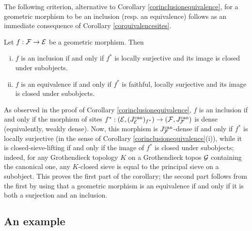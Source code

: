 \documentclass[a4paper,12pt]{article}
\begin{document}
The following criterion, alternative to Corollary \ref{corinclusionequivalence}, for a geometric morphism to be an inclusion (resp. an equivalence) follows as an immediate consequence of Corollary \ref{corquivalencesites}.

\begin{corollary}\label{corinclusionequivalence2}
	Let $f:{\cal F}\to {\cal E}$ be a geometric morphism. Then
	
	\begin{enumerate}[(i)]
		\item $f$ is an inclusion if and only if $f^{\ast}$ is locally surjective and its image is closed under subobjects.

		\item $f$ is an equivalence if and only if $f^{\ast}$ is faithful, locally surjective and its image is closed under subobjects.		
	\end{enumerate}
\end{corollary}

\begin{proofs}
	As observed in the proof of Corollary \ref{corinclusionequivalence}, $f$ is an inclusion if and only if the morphism of sites $f^{\ast}:({\cal E}, ({J_{\cal E}^{\textup{can}}})_{f^{\ast}})\to ({\cal F}, J_{\cal F}^{\textup{can}})$ is dense (equivalently, weakly dense). Now, this morphism is $ J_{\cal F}^{\textup{can}}$-dense if and only if $f^{\ast}$ is locally surjective (in the sense of Corollary \ref{corinclusionequivalence}(i)), while it is closed-sieve-lifting if and only if the image of $f^{\ast}$ is closed under subobjects; indeed, for any Grothendieck topology $K$ on a Grothendieck topos $\cal G$ containing the canonical one, any $K$-closed sieve is equal to the principal sieve on a subobject. This proves the first part of the corollary; the second part follows from the first by using that a geometric morphism is an equivalence if and only if it is both a surjection and an inclusion.	
\end{proofs}

\subsection{An example}\label{sec:example}
\end{document}
